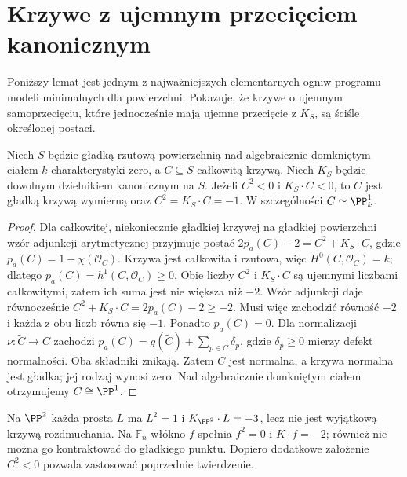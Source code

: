 \section{Krzywe z ujemnym przecięciem kanonicznym}
\label{sec:ga8-negative-curves}

Poniższy lemat jest jednym z najważniejszych elementarnych
ogniw programu modeli minimalnych dla powierzchni.
Pokazuje, że krzywe o ujemnym samoprzecięciu, które
jednocześnie mają ujemne przecięcie z $K_S$, są
ściśle określonej postaci.

\begin{twierdzenie}
\label{tw:ga8-negative-implies-minusone}
Niech $S$ będzie gładką rzutową powierzchnią nad
algebraicznie domkniętym ciałem $k$ charakterystyki zero,
a $C\subseteq S$ całkowitą krzywą. Niech $K_S$
będzie dowolnym dzielnikiem kanonicznym na $S$.
Jeżeli $C^2<0$ i $K_S\cdot C<0$,
to $C$ jest gładką krzywą wymierną oraz
$C^2=K_S\cdot C=-1$. W szczególności
$C\simeq\PP^1_k$.
\end{twierdzenie}
\begin{proof}
Dla całkowitej, niekoniecznie gładkiej krzywej
na gładkiej powierzchni wzór adjunkcji arytmetycznej
przyjmuje postać
$2p_a(C)-2=C^2+K_S\cdot C$, gdzie
$p_a(C)=1-\chi(\mathcal O_C)$.
Krzywa jest całkowita i rzutowa, więc
$H^0(C,\mathcal O_C)=k$; dlatego
$p_a(C)=h^1(C,\mathcal O_C)\ge0$.
Obie liczby $C^2$ i $K_S\cdot C$ są ujemnymi
liczbami całkowitymi, zatem ich suma jest nie
większa niż $-2$. Wzór adjunkcji daje równocześnie
$C^2+K_S\cdot C=2p_a(C)-2\ge-2$.
Musi więc zachodzić równość $-2$ i każda z obu
liczb równa się $-1$. Ponadto $p_a(C)=0$.
Dla normalizacji $\nu:\widetilde C\to C$ zachodzi
$p_a(C)=g(\widetilde C)+\sum_{p\in C}\delta_p$,
gdzie $\delta_p\ge0$ mierzy defekt normalności.
Oba składniki znikają. Zatem $C$ jest normalna,
a krzywa normalna jest gładka; jej rodzaj wynosi zero.
Nad algebraicznie domkniętym ciałem otrzymujemy
$C\cong\PP^1$.
\end{proof}

\begin{przyklad}
Na $\PP^2$ każda prosta $L$ ma $L^2=1$ i
$K_{\PP^2}\cdot L=-3$, lecz nie jest wyjątkową
krzywą rozdmuchania. Na $\mathbb F_n$ włókno $f$
spełnia $f^2=0$ i $K\cdot f=-2$; również nie
można go kontraktować do gładkiego punktu.
Dopiero dodatkowe założenie $C^2<0$ pozwala
zastosować poprzednie twierdzenie.
\end{przyklad}


